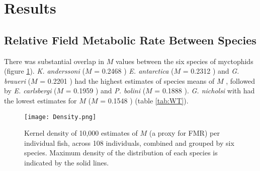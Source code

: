 \documentclass[12pt, titlepage]{article}
\begin{document}
\pagebreak
\section{Results}

\subsection{Relative Field Metabolic Rate Between Species}

There was substantial overlap in $M$ values between the six species of myctophids (figure \ref{fig:dens}).
\textit{K. anderssoni} ($M$ = 0.2468 ) \textit{E. antarctica} ($M$ = 0.2312 ) and \textit{G. braueri} ($M$ = 0.2201 ) had the highest estimates of species means of $M$ , followed by \textit{E. carlsbergi} ($M$ = 0.1959 ) and \textit{P. bolini} ($M$ = 0.1888 ).
\textit{G. nicholsi} with had the lowest estimates for $M$ ($M$ = 0.1548 ) (table \ref{tab:WT}).

\begin{figure}[H]
\texttt{[image: Density.png]}
\caption{Kernel density of 10,000 estimates of $M$ (a proxy for FMR) per individual fish, across 108 individuals, combined and grouped by six species. Maximum density of the distribution of each species is indicated by the solid lines.}
\label{fig:dens}
\end{figure}
\end{document}
